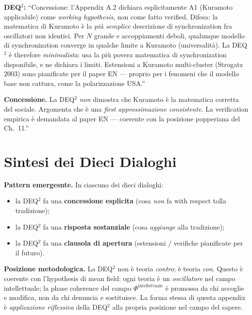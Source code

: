 \textbf{DEQ$^2$:} ``Concessione: l'Appendix A.2 dichiara esplicitamente A1
(Kuramoto applicabile) come \emph{working hypothesis}, non come fatto
verified. Difesa: la matematica di Kuramoto è la \emph{più semplice}
descrizione di synchronization fra oscillatori non identici. Per \(N\)
grande e accoppiamenti deboli, qualunque modello di synchronization
converge in qualche limite a Kuramoto (universalità). La DEQ$^2$ è therefore
\emph{minimalista}: usa la più povera matematica di synchronization
disponibile, e ne dichiara i limiti. Estensioni a Kuramoto multi-cluster
(Strogatz 2003) sono pianificate per il paper EN --- proprio per i
fenomeni che il modello base non cattura, come la polarizzazione USA.''

\textbf{Concessione.} La DEQ$^2$ \emph{non} dimostra che Kuramoto è la
matematica corretta del sociale. Argomenta che è una \emph{first
approssimazione consistente}. La verification empirica è demandata al paper
EN --- coerente con la posizione popperiana del Ch.~11.''



\section{Sintesi dei Dieci Dialoghi}\label{sintesi-dei-dieci-dialoghi}

\Proved{} \textbf{Pattern emergesnte.} In ciascuno dei dieci dialoghi:

\begin{itemize}
\tightlist
\item
  la DEQ$^2$ fa una \textbf{concessione esplicita} (cosa \emph{non} fa
  with respect tolla tradizione);
\item
  la DEQ$^2$ fa una \textbf{risposta sostanziale} (cosa \emph{aggiunge}
  alla tradizione);
\item
  la DEQ$^2$ fa una \textbf{clausola di apertura} (estensioni / verifiche
  pianificate per il futuro).
\end{itemize}

\Hypoth{} \textbf{Posizione metodologica.} La DEQ$^2$ non è teoria
\emph{contro}; è teoria \emph{con}. Questo è coerente con l'hypothesis di
mean field: ogni teoria è un \emph{oscillatore} nel campo
intellettuale; la phase coherence del campo
\(\Phi^{\text{intellettuale}}\) è promossa da chi accoglie e modifica,
non da chi denuncia e sostituisce. La forma stessa di questa appendix è
\emph{applicazione riflessiva} della DEQ$^2$ alla propria posizione nel
campo del sapere.


